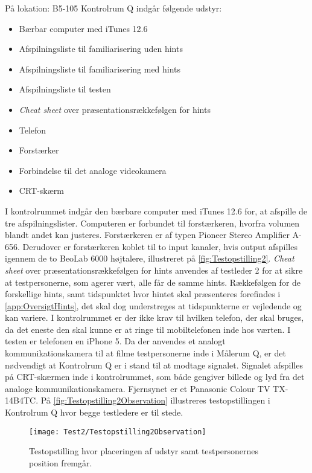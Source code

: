 \noindent
% 
På lokation: B5-105 Kontrolrum Q indgår følgende udstyr:
\begin{itemize}
  \item Bærbar computer med iTunes 12.6
  \item Afspilningsliste til familiarisering uden hints 
  \item Afspilningsliste til familiarisering med hints
  \item Afspilningsliste til testen
  \item \textit{Cheat sheet} over præsentationsrækkefølgen for hints 
  \item Telefon
  \item Forstærker 
  \item Forbindelse til det analoge videokamera
  \item CRT-skærm \blankline
\noindent
\end{itemize}
%
I kontrolrummet indgår den bærbare computer med iTunes 12.6 for, at afspille de tre afspilningslister. Computeren er forbundet til forstærkeren, hvorfra volumen blandt andet kan justeres. Forstærkeren er af typen Pioneer Stereo Amplifier A-656. Derudover er forstærkeren koblet til to input kanaler, hvis output afspilles igennem de to BeoLab 6000 højtalere, illustreret på \autoref{fig:Testopstilling2}. \textit{Cheat sheet} over præsentationsrækkefølgen for hints anvendes af testleder 2 for at sikre at testpersonerne, som agerer vært, alle får de samme hints. Rækkefølgen for de forskellige hints, samt tidspunktet hvor hintet skal præsenteres forefindes i \autoref{app:OversigtHints}, det skal dog understreges at tidspunkterne er vejledende og kan variere. I kontrolrummet er der ikke krav til hvilken telefon, der skal bruges, da det eneste den skal kunne er at ringe til mobiltelefonen inde hos værten. I testen er telefonen en iPhone 5. Da der anvendes et analogt kommunikationskamera til at filme testpersonerne inde i Målerum Q, er det nødvendigt at Kontrolrum Q er i stand til at modtage signalet. Signalet afspilles på CRT-skærmen inde i kontrolrummet, som både gengiver billede og lyd fra det analoge kommunikationskamera. Fjernsynet er et Panasonic Colour TV TX-14B4TC. På \autoref{fig:Testopstilling2Observation} illustreres testopstillingen i Kontrolrum Q hvor begge testledere er til stede.   
%
\begin{figure}[H]
	\centering
	\texttt{[image: Test2/Testopstilling2Observation]}
	\caption{Testopstilling hvor placeringen af udstyr samt testpersonernes position fremgår.}
	\label{fig:Testopstilling2Observation}
\end{figure}
\noindent
% 


